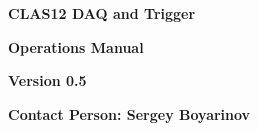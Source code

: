 \documentclass[12pt]{article}
\begin{document}
\thispagestyle{empty}
\begin{center}
{\Huge \bf CLAS12 DAQ and Trigger}
\end{center}
\begin{center}
{\Huge \bf Operations Manual}
\end{center}
\vspace{2cm}

\begin{center}
{\Large \bf Version 0.5}
\end{center}
\vspace{2cm}

\begin{center}
{\Large \bf Contact Person: Sergey Boyarinov}
\end{center}
\vspace{2cm}

\pagestyle{empty}

\thispagestyle{empty}

\newpage

\renewcommand{\headrulewidth}{0pt}
\renewcommand{\footrulewidth}{0pt}
\pagestyle{myheading}


\end{document}
